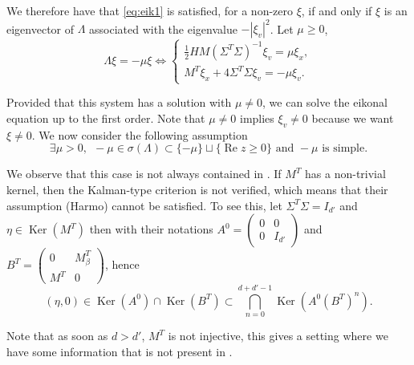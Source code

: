 \documentclass[12pt]{amsart}
\renewcommand{\Re}{\operatorname{Re}}
\newcommand{\Ker}{\operatorname{Ker}}
\numberwithin{equation}{section}
\numberwithin{figure}{section}
\begin{document}
We therefore have that \eqref{eq:eik1} is satisfied, for a non-zero $\xi$, if and only if $\xi$ is an eigenvector of $\Lambda$ associated with the eigenvalue $-|\xi_v|^2$. Let $\mu\geq0$,
\begin{equation}\label{eq:Lambdamu}
\Lambda\xi = -\mu\xi \iff \left\{\begin{array}{l}
    \frac12HM(\Sigma^T\Sigma)^{-1}\xi_v = \mu\xi_x,\\
    M^T\xi_x+ 4\Sigma^T\Sigma\xi_v = -\mu\xi_v.
\end{array}\right.
\end{equation}

Provided that this system has a solution with $\mu\neq0$, we can solve the eikonal equation up to the first order. Note that $\mu\neq0$ implies $\xi_v\neq0$ because we want $\xi\neq0$. We now consider the following assumption
\begin{equation}\label{ass.simple}\tag{Simple}
    \exists \mu>0,\ \ -\mu\in\sigma(\Lambda)\subset\{-\mu\}\sqcup\{\Re z\geq0\}\text{ and }-\mu\text{ is simple.}
\end{equation}

We observe that this case is not always contained in \cite{BoLePMi22}. If $M^T$ has a non-trivial kernel, then the Kalman-type criterion \cite[Remark 2.5]{BoLePMi22} is not verified, which means that their assumption (Harmo) cannot be satisfied. To see this, let $\Sigma^T\Sigma = I_{d'}$ and $\eta\in\Ker(M^T)$ then with their notations $A^0 = \begin{pmatrix}0&0\\0&I_{d'}\end{pmatrix}$ and $B^T = \begin{pmatrix}0&M_\beta^T\\M^T&0\end{pmatrix}$, hence
\begin{equation*}
(\eta,0)\in\Ker(A^0)\cap\Ker(B^T)\subset\bigcap_{n=0}^{d+d'-1}\Ker(A^0(B^T)^n).
\end{equation*}

Note that as soon as $d>d'$, $M^T$ is not injective, this gives a setting where we have some information that is not present in \cite{BoLePMi22}.
\end{document}
